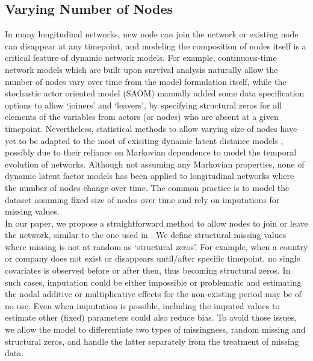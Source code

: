 \documentclass[a4paper]{article}
\begin{document}
\subsection{Varying Number of Nodes}\label{subsec: varying number of nodes}
In many longitudinal networks, new node can join the network or existing node can disappear at any timepoint, and modeling the composition of nodes itself is a critical feature of dynamic network models. For example, continuous-time network models which are built upon survival analysis \citep{snijders2010introduction,butts2008relational,vu2011continuous,hunter2011dynamic,perry2013point} naturally allow the number of nodes vary over time from the model formulation itself, while the stochastic actor oriented model (SAOM) \citep{snijders2010introduction} manually added some data specification options to allow `joiners' and `leavers', by specifying structural zeros for all elements of the variables from actors (or nodes) who are absent at a given timepoint. Nevertheless, statistical methods to allow varying size of nodes have yet to be adapted to the most of exisiting dynamic latent distance models \citep{sarkar2005dynamic,sewell2015latent,friel2016interlocking}, possibly due to their reliance on Markovian dependence to model the temporal evolution of networks. Although not assuming any Markovian properties, none of dynamic latent factor models \citep{durante2013nonparametric,hoff2008modeling,minhas2016inferential} has been applied to longitudinal networks where the number of nodes change over time. The common practice is to model the dataset assuming fixed size of nodes over time and rely on imputations for missing values.\\ \newline
In our paper, we propose a straightforward method to allow nodes to join or leave the network, similar to the one used in \cite{snijders2010introduction}. We define structural missing values where missing is not at random as `structural zeros'. For example, when a country or company does not exist or disappears until/after specific timepoint, no single covariates is observed before or after then, thus becoming structural zeros. In such cases, imputation could be either impossible or problematic and estimating the nodal additive or multiplicative effects for the non-existing period may be of no use. Even when imputation is possible, including the imputed values to estimate other (fixed) parameters could also reduce bias. To avoid those issues, we allow the model to differentiate two types of missingness, random missing and structural zeros, and handle the latter separately from the treatment of missing data.  \\ \newline
\end{document}
